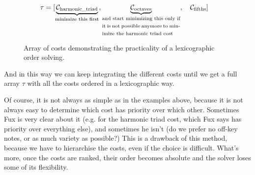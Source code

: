 \begin{figure}[h]
    \begin{equation}
        \begin{aligned}
            \tau = [& \underset{\text{\fontsize{7}{11}\selectfont{minimize this first}}}{\underbrace{\mathcal{C}_\text{harmonic\_triad}}}, \underset{\text{\fontsize{7}{11}\selectfont\parbox{4cm}{and start minimizing this only if it is not possible anymore to minimize the harmonic triad cost}}}{\underbrace{\mathcal{C}_\text{octaves}}},\quad  \mathcal{C}_\text{fifths}]
        \end{aligned}
    \end{equation}
    \caption{Array of costs demonstrating the practicality of a lexicographic order solving.}
\end{figure}

And in this way we can keep integrating the different costs until we get a full array $\tau$ with all the costs ordered in a lexicographic way.


Of course, it is not always as simple as in the examples above, because it is not always easy to determine which cost has priority over which other. Sometimes Fux is very clear about it (e.g. for the harmonic triad cost, which Fux says has priority over everything else), and sometimes he isn't (do we prefer no off-key notes, or as much variety as possible?) This is a drawback of this method, because we have to hierarchise the costs, even if the choice is difficult. What's more, once the costs are ranked, their order becomes absolute and the solver loses some of its flexibility.


